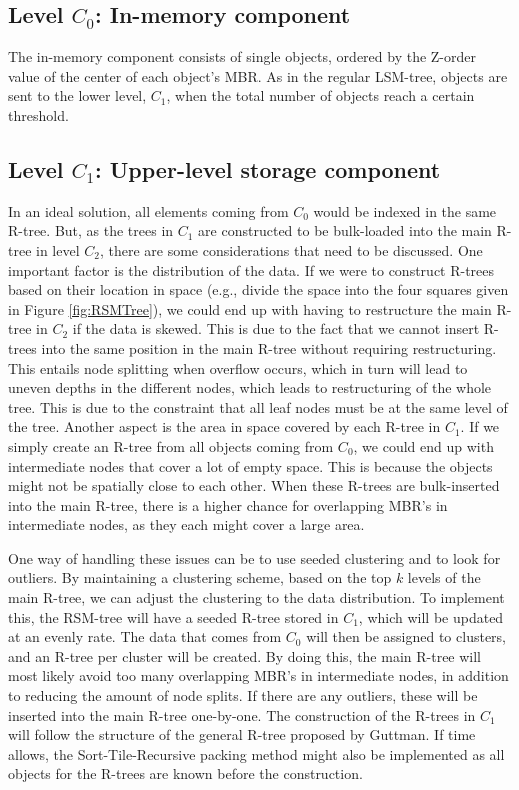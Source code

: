 \subsection{Level $C_0$: In-memory component}
The in-memory component consists of single objects, ordered by the Z-order value of the center of each object's MBR. As in the regular LSM-tree, objects are sent to the lower level, $C_1$, when the total number of objects reach a certain threshold. 

\subsection{Level $C_1$: Upper-level storage component}
In an ideal solution, all elements coming from $C_0$ would be indexed in the same R-tree. But, as the trees in $C_1$ are constructed to be bulk-loaded into the main R-tree in level $C_2$, there are some considerations that need to be discussed. One important factor is the distribution of the data. If we were to construct R-trees based on their location in space (e.g., divide the space into the four squares given in Figure \ref{fig:RSMTree}), we could end up with having to restructure the main R-tree in $C_2$ if the data is skewed. This is due to the fact that we cannot insert R-trees into the same position in the main R-tree without requiring restructuring. This entails node splitting when overflow occurs, which in turn will lead to uneven depths in the different nodes, which leads to restructuring of the whole tree. This is due to the constraint that all leaf nodes must be at the same level of the tree. Another aspect is the area in space covered by each R-tree in $C_1$. If we simply create an R-tree from all objects coming from $C_0$, we could end up with intermediate nodes that cover a lot of empty space. This is because the objects might not be spatially close to each other. When these R-trees are bulk-inserted into the main R-tree, there is a higher chance for overlapping MBR's in intermediate nodes, as they each might cover a large area. \newline

\noindent
One way of handling these issues can be to use seeded clustering\cite{SeededClustering} and to look for outliers. By maintaining a clustering scheme, based on the top $k$ levels of the main R-tree, we can adjust the clustering to the data distribution. To implement this, the RSM-tree will have a seeded R-tree stored in $C_1$, which will be updated at an evenly rate. The data that comes from $C_0$ will then be assigned to clusters, and an R-tree per cluster will be created. By doing this, the main R-tree will most likely avoid too many overlapping MBR's in intermediate nodes, in addition to reducing the amount of node splits. If there are any outliers, these will be inserted into the main R-tree one-by-one. The construction of the R-trees in $C_1$ will follow the structure of the general R-tree proposed by Guttman\cite{r-tree}. If time allows, the Sort-Tile-Recursive packing method\cite{STR} might also be implemented as all objects for the R-trees are known before the construction.

